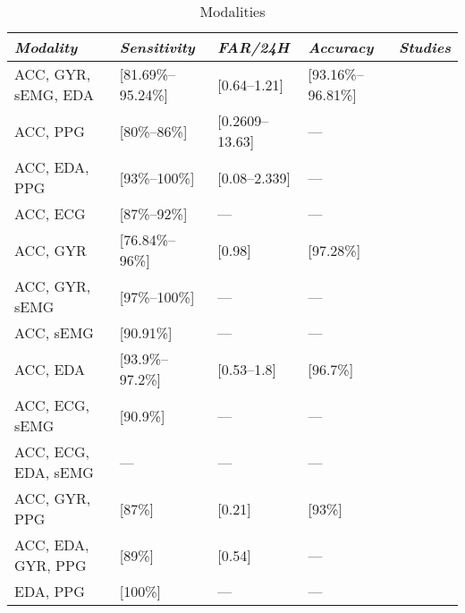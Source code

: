 \renewcommand{\arraystretch}{1.5}

\begin{table}
    \caption{Modalities}
    \vspace{1em}
    \label{tab:modalities}
    \footnotesize
\begin{tabularx}{\textwidth}{lXXXX}
    
\hline
\textit{Modality} & \textit{Sensitivity} & \textit{FAR/24H} & \textit{Accuracy} & \textit{Studies} \Tstrut\Bstrut \\
\hline \Tstrut
ACC, GYR, sEMG, EDA & [81.69\%--95.24\%] & [0.64--1.21] & [93.16\%--96.81\%] & \cite{Wang2025-ql, Ge2023-ab, Li2022-ty, Wu2024-yl, Wang2022-lt} \\
ACC, PPG & [80\%--86\%] & [0.2609--13.63] & --- & \cite{Ali2020-ke, Tang2021-td, Arends2018-ew, Yu2023-ss} \\
ACC, EDA, PPG & [93\%--100\%] & [0.08--2.339] & --- & \cite{Xu2022-tx, Nasseri2021-xn} \\
ACC, ECG & [87\%--92\%] & --- & --- & \cite{Van_Andel2017-yx, Hegarty-Craver2021-hk} \\
ACC, GYR & [76.84\%--96\%] & [0.98] & [97.28\%] & \cite{Larsen2024-vn, Dong2022-oo} \\
ACC, GYR, sEMG & [97\%--100\%] & --- & --- & \cite{Wang2025-my, Gheryani2017-yg} \\
ACC, sEMG & [90.91\%] & --- & --- & \cite{Milosevic2016-ee} \\
ACC, EDA & [93.9\%--97.2\%] & [0.53--1.8] & [96.7\%] & \cite{Regalia2019-ch, Poh2012-af, Chowdhury2022-bi} \\
ACC, ECG, sEMG & [90.9\%] & --- & --- & \cite{De_Cooman2018-pq} \\
ACC, ECG, EDA, sEMG & --- & --- & --- & \cite{Hamlin2021-sd} \\
ACC, GYR, PPG & [87\%] & [0.21] & [93\%] & \cite{Vakilna2024-hk} \\
ACC, EDA, GYR, PPG & [89\%] & [0.54] & --- & \cite{Jiang2022-zu} \\
EDA, PPG & [100\%] & --- & --- & \cite{Cogan2017-lg}

\end{tabularx}

\end{table}